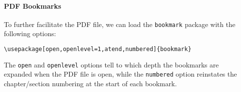 \paragraph{PDF Bookmarks} To further facilitate the PDF file, we can load the \texttt{bookmark} package with the following options:
\begin{lstlisting}
\usepackage[open,openlevel=1,atend,numbered]{bookmark}
\end{lstlisting}
The \texttt{open} and \texttt{openlevel} options tell to which depth the bookmarks are expanded when the PDF file is open, while the \texttt{numbered} option reinstates the chapter/section numbering at the start of each bookmark.
